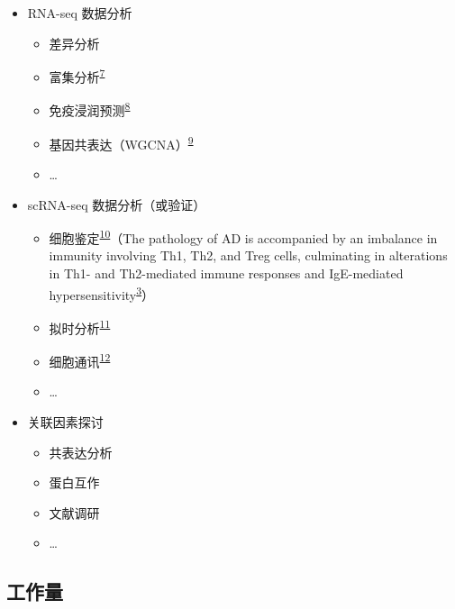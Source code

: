\documentclass[
]{article}
\providecommand{\tightlist}{%
  \setlength{\itemsep}{0pt}\setlength{\parskip}{0pt}}
\begin{document}
\begin{itemize}
\tightlist
\item
  RNA-seq 数据分析

  \begin{itemize}
  \tightlist
  \item
    差异分析
  \item
    富集分析\textsuperscript{\protect\hyperlink{ref-ClusterprofilerWuTi2021}{7}}
  \item
    免疫浸润预测\textsuperscript{\protect\hyperlink{ref-EstimatingTheBecht2016}{8}}
  \item
    基因共表达（WGCNA）\textsuperscript{\protect\hyperlink{ref-WgcnaAnRPacLangfe2008}{9}}
  \item
    \ldots{}
  \end{itemize}
\item
  scRNA-seq 数据分析（或验证）

  \begin{itemize}
  \tightlist
  \item
    细胞鉴定\textsuperscript{\protect\hyperlink{ref-IntegratedAnalHaoY2021}{10}}（The pathology of AD is accompanied by an imbalance in immunity involving Th1, Th2, and Treg cells, culminating in alterations in Th1- and Th2-mediated immune responses and IgE-mediated hypersensitivity\textsuperscript{\protect\hyperlink{ref-SkinBarrierAbYang2020}{3}}）
  \item
    拟时分析\textsuperscript{\protect\hyperlink{ref-TheDynamicsAnTrapne2014}{11}}
  \item
    细胞通讯\textsuperscript{\protect\hyperlink{ref-InferenceAndAJinS2021}{12}}
  \item
    \ldots{}
  \end{itemize}
\item
  关联因素探讨

  \begin{itemize}
  \tightlist
  \item
    共表达分析
  \item
    蛋白互作
  \item
    文献调研
  \item
    \ldots{}
  \end{itemize}
\end{itemize}

\hypertarget{ux5de5ux4f5cux91cf}{%
\subsection{工作量}\label{ux5de5ux4f5cux91cf}}
\end{document}

